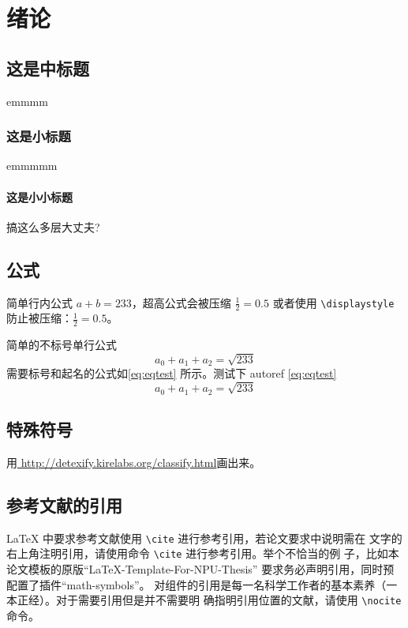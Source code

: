 \documentclass[lang=chs, degree=phd, blindreview=false, winfonts=true]{yanputhesis}
\begin{document}
\chapter{绪论}
\section{这是中标题}
emmmm
\subsection{这是小标题}
emmmmm
\subsubsection{这是小小标题}
搞这么多层大丈夫?

\section{公式}
简单行内公式 $a+b=233$，超高公式会被压缩 $\frac{1}{2}=0.5$ 或者使用
\lstinline`\displaystyle` 防止被压缩：$\displaystyle \frac{1}{2}=0.5$。

简单的不标号单行公式
$$a_0+a_1+a_2=\sqrt{233}$$
需要标号和起名的公式如\autoref{eq:eqtest} 所示。测试下 autoref \autoref{eq:eqtest}
\begin{equation}
    \label{eq:eqtest}
    a_0 + a_1 + a_2 = \sqrt{233}
\end{equation}

\section{特殊符号}

用\href{http://detexify.kirelabs.org/classify.html}{
    http://detexify.kirelabs.org/classify.html}画出来。

\section{参考文献的引用}

\LaTeX{} 中要求参考文献使用 \lstinline`\cite` 进行参考引用，若论文要求中说明需在
文字的右上角注明引用，请使用命令 \lstinline`\cite` 进行参考引用。举个不恰当的例
子，比如本论文模板的原版“LaTeX-Template-For-NPU-Thesis”\cite{NWPUThesisLaTeXTemplate}
要求务必声明引用，同时预配置了插件“math-symbols”\cite{MathSymbolsinLaTeXbypolossk}。
对组件的引用是每一名科学工作者的基本素养（一本正经）。对于需要引用但是并不需要明
确指明引用位置的文献，请使用 \lstinline`\nocite` 命令。
\end{document}
